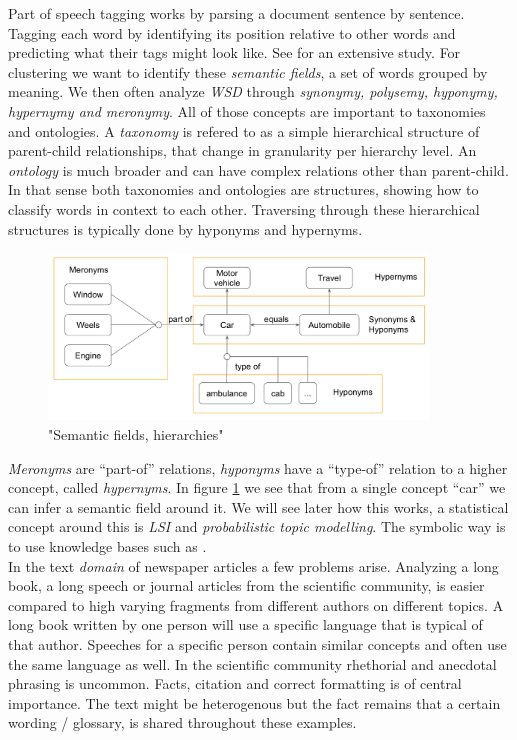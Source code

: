   Part of speech tagging works by parsing a document sentence by sentence. Tagging each word by identifying its position relative to other words and predicting what their tags might look like. See \cite[chp. 5]{NLPBookJurafsky2000} for an extensive study.
  For clustering we want to identify these \emph{semantic fields}, a set of words grouped by meaning. We then often analyze \emph{WSD} through \emph{synonymy, polysemy, hyponymy, hypernymy and meronymy}. All of those concepts are important to taxonomies and ontologies. A \emph{taxonomy} is refered to as a simple hierarchical structure of parent-child relationships, that change in granularity per hierarchy level. An \emph{ontology} is much broader and can have complex relations other than parent-child. In that sense both taxonomies and ontologies are structures, showing how to classify words in context to each other. Traversing through these hierarchical structures is typically done by hyponyms and hypernyms. 

    \begin{figure}[h!]
      \centering
        \includegraphics[width=0.9\textwidth]{wsd_analysis.png}
        \caption{"Semantic fields, hierarchies"}
        \label{wsd_analysis}
    \end{figure} 

  \emph{Meronyms} are ``part-of'' relations, \emph{hyponyms} have a ``type-of'' relation to a higher concept, called \emph{hypernyms}. In figure \ref{wsd_analysis} we see that from a single concept ``car'' we can infer a semantic field around it. We will see later how this works, a statistical concept around this is \emph{LSI} and \emph{probabilistic topic modelling}. The symbolic way is to use knowledge bases such as \wordwiki{}.\\

  In the text \emph{domain} of newspaper articles a few problems arise. Analyzing a long book, a long speech or journal articles from the scientific community, is easier compared to high varying fragments from different authors on different topics. A long book written by one person will use a specific language that is typical of that author. Speeches for a specific person contain similar concepts and often use the same language as well. In the scientific community rhethorial and anecdotal phrasing is uncommon. Facts, citation and correct formatting is of central importance. The text might be heterogenous but the fact remains that a certain wording / glossary, is shared throughout these examples.\\

